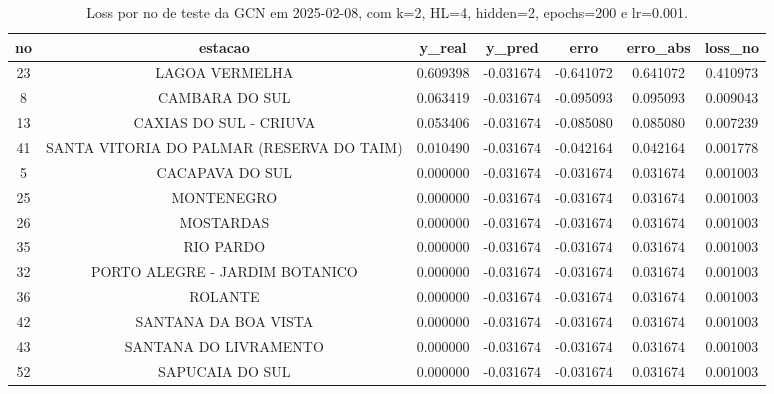 \begin{table}[h]
\centering
\caption{Loss por no de teste da GCN em 2025-02-08, com k=2, HL=4, hidden=2, epochs=200 e lr=0.001.}
\label{tab:gcn_loss_k2_hl4_h2_e200_d20250208}
\begin{tabular}{ccccccc}
\toprule
no & estacao & y\_real & y\_pred & erro & erro\_abs & loss\_no \\
\midrule
23 & LAGOA VERMELHA & 0.609398 & -0.031674 & -0.641072 & 0.641072 & 0.410973 \\
8 & CAMBARA DO SUL & 0.063419 & -0.031674 & -0.095093 & 0.095093 & 0.009043 \\
13 & CAXIAS DO SUL - CRIUVA & 0.053406 & -0.031674 & -0.085080 & 0.085080 & 0.007239 \\
41 & SANTA VITORIA DO PALMAR (RESERVA DO TAIM) & 0.010490 & -0.031674 & -0.042164 & 0.042164 & 0.001778 \\
5 & CACAPAVA DO SUL & 0.000000 & -0.031674 & -0.031674 & 0.031674 & 0.001003 \\
25 & MONTENEGRO & 0.000000 & -0.031674 & -0.031674 & 0.031674 & 0.001003 \\
26 & MOSTARDAS & 0.000000 & -0.031674 & -0.031674 & 0.031674 & 0.001003 \\
35 & RIO PARDO & 0.000000 & -0.031674 & -0.031674 & 0.031674 & 0.001003 \\
32 & PORTO ALEGRE - JARDIM BOTANICO & 0.000000 & -0.031674 & -0.031674 & 0.031674 & 0.001003 \\
36 & ROLANTE & 0.000000 & -0.031674 & -0.031674 & 0.031674 & 0.001003 \\
42 & SANTANA DA BOA VISTA & 0.000000 & -0.031674 & -0.031674 & 0.031674 & 0.001003 \\
43 & SANTANA DO LIVRAMENTO & 0.000000 & -0.031674 & -0.031674 & 0.031674 & 0.001003 \\
52 & SAPUCAIA DO SUL & 0.000000 & -0.031674 & -0.031674 & 0.031674 & 0.001003 \\
\bottomrule
\end{tabular}
\end{table}
